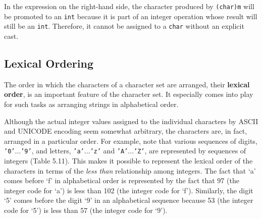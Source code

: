 \noindent In the expression on the right-hand side, the
character produced by {\tt (char)m} will be promoted to an {\tt int}
because it is part of an integer operation whose result will still be
an {\tt int}.  Therefore, it cannot be assigned to a {\tt char} without
an explicit cast.





\subsection{Lexical Ordering}
\noindent The order in which the characters of a character set 
are arranged, their {\bf lexical order}, is an important feature
of the character set. It especially comes into play for such
tasks as arranging strings in alphabetical order. 

Although the actual integer values assigned to the individual
characters by ASCII and UNICODE encoding seem somewhat arbitrary, the
characters are, in fact, arranged in a particular order.  For example,
note that various sequences of digits, {\tt '0'$\ldots$'9'}, and
letters, {\tt 'a'$\ldots$'z'} and {\tt 'A'$\ldots$'Z'}, are
represented by sequences of integers (Table 5.11). This makes it
possible to represent the lexical order of the characters in terms of
the {\it less than} relationship among integers.  The fact that `a'
comes before `f' in alphabetical order is represented by the fact that
97 (the integer code for `a') is less than 102 (the integer code for
`f'). Similarly, the digit `5' comes before the digit `9' in an
alphabetical sequence because 53 (the integer code for `5') is less
than 57 (the integer code for `9').

